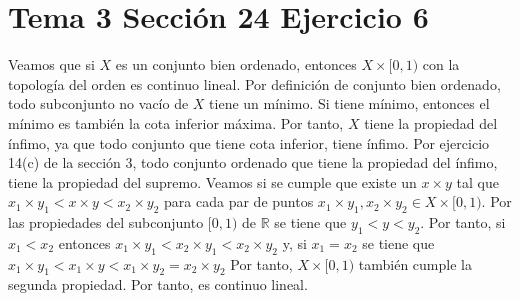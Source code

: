 \documentclass{article}
\begin{document}
\section{Tema 3 Sección 24 Ejercicio 6}
Veamos que si $X$ es un conjunto bien ordenado, entonces $X\times [0,1)$ con la topología del orden es continuo lineal.
Por definición de conjunto bien ordenado, todo subconjunto no vacío de $X$ tiene un mínimo. Si tiene mínimo, entonces el mínimo es también la cota inferior máxima. Por tanto, $X$ tiene la propiedad del ínfimo, ya que todo conjunto que tiene cota inferior, tiene ínfimo. Por ejercicio 14(c) de la sección 3, todo conjunto ordenado que tiene la propiedad del ínfimo, tiene la propiedad del supremo.
Veamos si se cumple que existe un $x\times y$ tal que $x_1\times y_1<x\times y< x_2\times y_2$ para cada par de puntos  $x_1\times y_1, x_2\times y_2\in X\times [0,1)$. Por las propiedades del subconjunto $[0,1)$ de $\mathbb{R}$ se tiene que  $y_1<y< y_2$. Por tanto, si $x_1<x_2$ entonces $x_1\times y_1<x_2 \times y_1<x_2\times y_2$ y, si $x_1=x_2$ se tiene que $x_1\times y_1<x_1\times y<x_1\times y_2=x_2\times y_2$ Por tanto, $X\times [0,1)$ también cumple la segunda propiedad. Por tanto, es continuo lineal.
\end{document}
